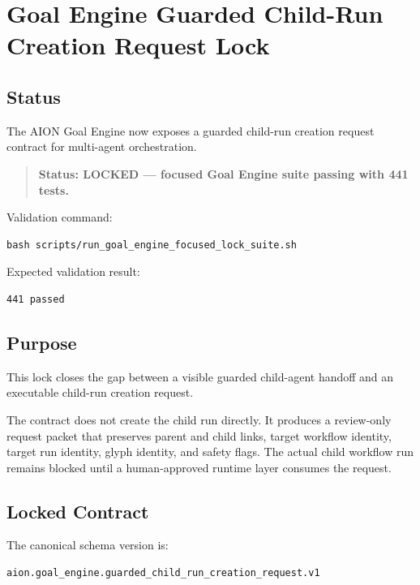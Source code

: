\section{Goal Engine Guarded Child-Run Creation Request Lock}
\label{sec:aion-goal-engine-guarded-child-run-creation-request-lock}

\subsection{Status}

The AION Goal Engine now exposes a guarded child-run creation request contract for multi-agent orchestration.

\begin{quote}
\textbf{Status: LOCKED --- focused Goal Engine suite passing with 441 tests.}
\end{quote}

Validation command:

\begin{verbatim}
bash scripts/run_goal_engine_focused_lock_suite.sh
\end{verbatim}

Expected validation result:

\begin{verbatim}
441 passed
\end{verbatim}

\subsection{Purpose}

This lock closes the gap between a visible guarded child-agent handoff and an executable child-run creation request.

The contract does not create the child run directly. It produces a review-only request packet that preserves parent and child links, target workflow identity, target run identity, glyph identity, and safety flags. The actual child workflow run remains blocked until a human-approved runtime layer consumes the request.

\subsection{Locked Contract}

The canonical schema version is:

\begin{verbatim}
aion.goal_engine.guarded_child_run_creation_request.v1
\end{verbatim}

